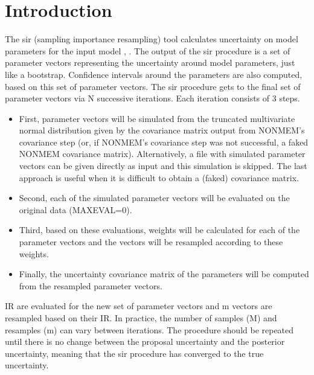 
\usepackage{amsmath}
\usepackage{hyperref}


\maketitle
\tableofcontents
\newpage

\newcommand{\guidetoolname}{sir}


\section{Introduction}
The sir (sampling importance resampling) tool calculates uncertainty on model parameters for the input model \cite{Dosne2013}, \cite{Dosne2015}. The output of the sir procedure is a set of parameter vectors representing the uncertainty around model parameters, just like a bootstrap. Confidence intervals around the parameters are also computed, based on this set of parameter vectors.
The sir procedure gets to the final set of parameter vectors via N successive iterations. Each iteration consists of 3 steps.
\begin{itemize}
\item First, parameter vectors will be simulated from the truncated multivariate normal distribution given by the covariance matrix output from NONMEM’s covariance step (or, if NONMEM’s covariance step was not successful, a faked NONMEM covariance matrix). Alternatively, a file with simulated parameter vectors can be given directly as input and this simulation is skipped. The last	approach is useful when it is difficult to obtain a (faked) covariance matrix.
\item Second, each of the simulated parameter vectors will be evaluated on the
original data (MAXEVAL=0).
\item Third, based on these evaluations, weights will be calculated for each of the parameter vectors and the vectors will be
resampled according to these weights.
\item Finally, the uncertainty covariance matrix of the parameters will be computed from the resampled parameter vectors.
\end{itemize}
IR are evaluated for the new set of parameter vectors and m vectors are resampled based on their IR. In practice, the number of samples (M) and resamples (m) can vary between iterations. The procedure should be repeated until there is no change between the proposal uncertainty and the posterior uncertainty, meaning that the sir procedure has converged to the true uncertainty.

